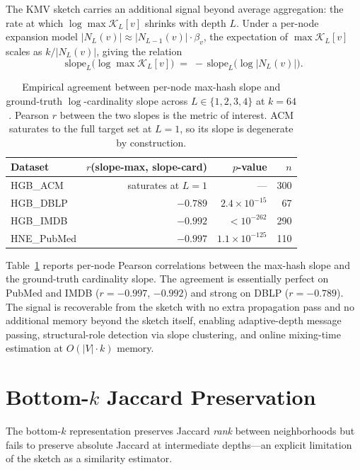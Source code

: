 \documentclass[sigconf]{acmart}
\begin{document}
The KMV sketch carries an additional signal beyond average aggregation: the rate at which $\log\max\mathcal{K}_L[v]$ shrinks with depth $L$. Under a per-node expansion model $|N_L(v)| \approx |N_{L-1}(v)| \cdot \beta_v$, the expectation of $\max\mathcal{K}_L[v]$ scales as $k/|N_L(v)|$, giving the relation
\[
  \mathrm{slope}_L\bigl(\log\max\mathcal{K}_L[v]\bigr) \;=\; -\,\mathrm{slope}_L\bigl(\log|N_L(v)|\bigr).
\]

\begin{table}[H]
\caption{Empirical agreement between per-node max-hash slope and ground-truth $\log$-cardinality slope across $L\in\{1,2,3,4\}$ at $k{=}64$. Pearson $r$ between the two slopes is the metric of interest. ACM saturates to the full target set at $L{=}1$, so its slope is degenerate by construction.}
\label{tab:i4}
\centering\small
\begin{tabular}{lrrr}
\toprule
Dataset & $r$(slope-max, slope-card) & $p$-value & $n$ \\
\midrule
HGB\_ACM    & saturates at $L{=}1$ & --- & 300 \\
HGB\_DBLP   & $-0.789$ & $2.4\times 10^{-15}$ & 67 \\
HGB\_IMDB   & $-0.992$ & $<10^{-262}$         & 290 \\
HNE\_PubMed & $-0.997$ & $1.1\times 10^{-125}$ & 110 \\
\bottomrule
\end{tabular}
\end{table}

Table~\ref{tab:i4} reports per-node Pearson correlations between the max-hash slope and the ground-truth cardinality slope. The agreement is essentially perfect on PubMed and IMDB ($r{=}-0.997$, $-0.992$) and strong on DBLP ($r{=}-0.789$). The signal is recoverable from the sketch with no extra propagation pass and no additional memory beyond the sketch itself, enabling adaptive-depth message passing, structural-role detection via slope clustering, and online mixing-time estimation at $O(|V|\cdot k)$ memory.

\section{Bottom-$k$ Jaccard Preservation}
\label{sec:app-i5}

The bottom-$k$ representation preserves Jaccard \emph{rank} between neighborhoods but fails to preserve absolute Jaccard at intermediate depths---an explicit limitation of the sketch as a similarity estimator.
\end{document}

